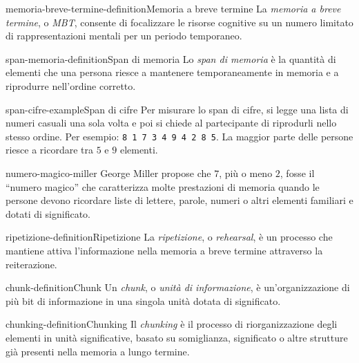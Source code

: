 \documentclass[preview]{standalone}
\begin{document}
\begin{snippetdefinition}{memoria-breve-termine-definition}{Memoria a breve termine}
    La \emph{memoria a breve termine}, o \emph{MBT}, consente di focalizzare le
    risorse cognitive su un numero limitato di rappresentazioni mentali per un
    periodo temporaneo.
\end{snippetdefinition}

\begin{snippetdefinition}{span-memoria-definition}{Span di memoria}
    Lo \emph{span di memoria} è la quantità di elementi che una persona riesce a
    mantenere temporaneamente in memoria e a riprodurre nell'ordine corretto.
\end{snippetdefinition}

\begin{snippetexample}{span-cifre-example}{Span di cifre}
    Per misurare lo span di cifre, si legge una lista di numeri casuali una sola
    volta e poi si chiede al partecipante di riprodurli nello stesso ordine. Per
    esempio: \texttt{8 1 7 3 4 9 4 2 8 5}. La maggior parte delle persone
    riesce a ricordare tra \(5\) e \(9\) elementi.
\end{snippetexample}

\begin{snippet}{numero-magico-miller}
    George Miller propose che \(7\), più o meno \(2\), fosse il ``numero
    magico'' che caratterizza molte prestazioni di memoria quando le persone
    devono ricordare liste di lettere, parole, numeri o altri elementi familiari
    e dotati di significato.
\end{snippet}

\begin{snippetdefinition}{ripetizione-definition}{Ripetizione}
    La \emph{ripetizione}, o \emph{rehearsal}, è un processo che mantiene attiva
    l'informazione nella memoria a breve termine attraverso la reiterazione.
\end{snippetdefinition}

\begin{snippetdefinition}{chunk-definition}{Chunk}
    Un \emph{chunk}, o \emph{unità di informazione}, è un'organizzazione di più
    bit di informazione in una singola unità dotata di significato.
\end{snippetdefinition}

\begin{snippetdefinition}{chunking-definition}{Chunking}
    Il \emph{chunking} è il processo di riorganizzazione degli elementi in unità
    significative, basato su somiglianza, significato o altre strutture già
    presenti nella memoria a lungo termine.
\end{snippetdefinition}
\end{document}
